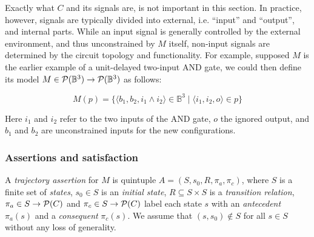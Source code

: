 
Exactly what $C$ and its signals are, is not important in this section. In practice, however, signals are typically divided into external, i.e. ``input'' and ``output'', and internal parts. While an input signal is generally controlled by the external environment, and thus unconstrained by $M$ itself, non-input signals are determined by the circuit topology and functionality. For example, supposed $M$ is the earlier example of a unit-delayed two-input AND gate, we could then define its model $M \in \mathcal{P}(\mathbb{B}^{3}) \rightarrow \mathcal{P}(\mathbb{B}^{3})$ as follows:


\begin{equation*}
M(p) = \{ \langle b_{1}, b_{2}, i_{1} \wedge i_{2} \rangle \in \mathbb{B}^{3} \mid \langle i_{1}, i_{2}, o \rangle \in p \}
\end{equation*}

\noindent Here $i_{1}$ and $i_{2}$ refer to the two inputs of the AND gate, $o$ the ignored output, and $b_{1}$ and $b_{2}$ are unconstrained inputs for the new configurations.

\subsubsection{Assertions and satisfaction} \label{sec:set-sat}

A \textit{trajectory assertion} for $M$ is quintuple $A = (S,s_{0},R,\pi_{a},\pi_{c})$, where $S$ is a finite set of \textit{states}, $s_{0} \in S$ is an \textit{initial state}, $R \subseteq S \times S$ is a \textit{transition relation}, $\pi_{a} \in S \rightarrow \mathcal{P}(C)$ and $\pi_{c} \in S \rightarrow \mathcal{P}(C)$ label each state $s$ with an \textit{antecedent} $\pi_{a}(s)$ and a \textit{consequent} $\pi_{c}(s)$. We assume that $(s,s_{0}) \notin S$ for all $s \in S$ without any loss of generality.



